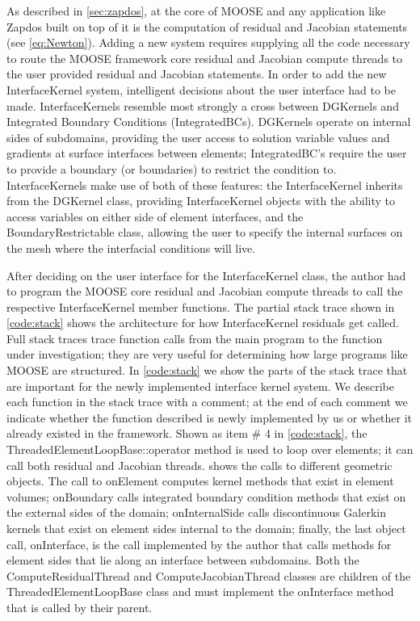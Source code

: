 As described in \cref{sec:zapdos}, at the core of MOOSE and any application like Zapdos built on top of it is the computation of residual and Jacobian statements (see \cref{eq:Newton}). Adding a new system requires supplying all the code necessary to route the MOOSE framework core residual and Jacobian compute threads to the user provided residual and Jacobian statements. In order to add the new InterfaceKernel system, intelligent decisions about the user interface had to be made. InterfaceKernels resemble most strongly a cross between DGKernels and Integrated Boundary Conditions (IntegratedBCs). DGKernels operate on internal sides of subdomains, providing the user access to solution variable values and gradients at surface interfaces between elements; IntegratedBC's require the user to provide a boundary (or boundaries) to restrict the condition to. InterfaceKernels make use of both of these features: the InterfaceKernel inherits from the DGKernel class, providing InterfaceKernel objects with the ability to access variables on either side of element interfaces, and the BoundaryRestrictable class, allowing the user to specify the internal surfaces on the mesh where the interfacial conditions will live.

After deciding on the user interface for the InterfaceKernel class, the author had to program the MOOSE core residual and Jacobian compute threads to call the respective InterfaceKernel member functions. The partial stack trace shown in \cref{code:stack} shows the architecture for how InterfaceKernel residuals get called. Full stack traces trace function calls from the main program to the function under investigation; they are very useful for determining how large programs like MOOSE are structured. In \cref{code:stack} we show the parts of the stack trace that are important for the newly implemented interface kernel system. We describe each function in the stack trace with a comment; at the end of each comment we indicate whether the function described is newly implemented by us or whether it already existed in the framework. Shown as item \# 4 in \cref{code:stack}, the ThreadedElementLoopBase::operator method is used to loop over elements; it can call both residual and Jacobian threads.  shows the calls to different geometric objects. The call to onElement computes kernel methods that exist in element volumes; onBoundary calls integrated boundary condition methods that exist on the external sides of the domain; onInternalSide calls discontinuous Galerkin kernels that exist on element sides internal to the domain; finally, the last object call, onInterface, is the call implemented by the author that calls methods for element sides that lie along an interface between subdomains. Both the ComputeResidualThread and ComputeJacobianThread classes are children of the ThreadedElementLoopBase class and must implement the onInterface method that is called by their parent.

